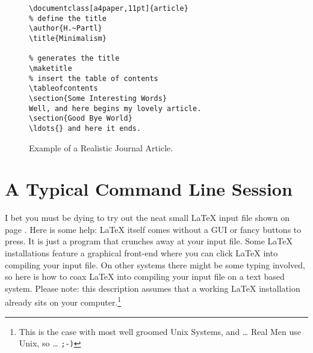 \begin{figure}[!bp]
\begin{lined}{10cm}
\begin{verbatim}
\documentclass[a4paper,11pt]{article}
% define the title
\author{H.~Partl}
\title{Minimalism}

% generates the title
\maketitle 
% insert the table of contents
\tableofcontents
\section{Some Interesting Words}
Well, and here begins my lovely article.
\section{Good Bye World}
\ldots{} and here it ends.

\end{verbatim}
\end{lined}
\caption{Example of a Realistic Journal Article.} \label{document}
\end{figure}

\section{A Typical Command Line Session}

I bet you must be dying to try out the neat small \LaTeX{} input file
shown on page \pageref{mini}. Here is some help:
\LaTeX{} itself comes without a GUI or
fancy buttons to press. It is just a program that crunches away at your
input file. Some \LaTeX{} installations feature a graphical front-end where
you can click \LaTeX{} into compiling your input file. On other systems
there might be some typing involved, so here is how to coax \LaTeX{} into
compiling your input file on a text based system. Please note: this
description assumes that a working \LaTeX{} installation already sits on
your computer.\footnote{This is the case with most well groomed Unix
Systems, and \ldots{} Real Men use Unix, so \ldots{} \texttt{;-)}}

